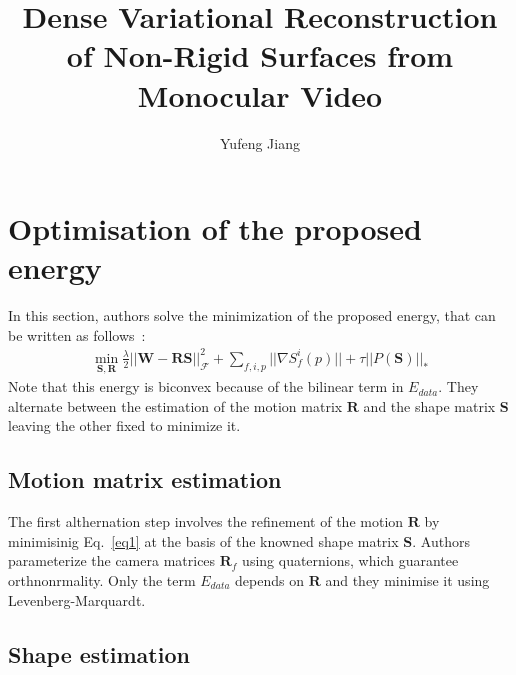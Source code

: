 \documentclass[10pt,twocolumn,letterpaper]{article}
\begin{document}
\title{Dense Variational Reconstruction of Non-Rigid Surfaces from Monocular Video}
\author{Yufeng Jiang}
\maketitle
\balance

\section{Optimisation of the proposed energy}

In this section, authors solve the minimization of the proposed energy, that can be written as follows~\cite{dense}:\\
\begin{gather}
\mathop{\min}\limits_{\mathbf{S},\mathbf{R}}\frac{\lambda}{2}||\mathbf{W} - \mathbf{RS}||_{\mathcal{F}}^2 + \sum_{f,i,p}||\nabla S_f^i(p)|| + \tau||P(\mathbf{S})||_{\ast}
\label{eq1}
\end{gather}
Note that this energy is biconvex because of the bilinear term in $E_{data}$. They alternate between the estimation of the motion matrix $\mathbf{R}$ and the shape matrix $\mathbf{S}$ leaving the other fixed to minimize it. 

\subsection{Motion matrix estimation}

The first althernation step involves the refinement of the motion $\mathbf{R}$ by minimisinig Eq.~\ref{eq1} at the basis of the knowned shape matrix $\mathbf{S}$. Authors parameterize the camera matrices $\mathbf{R}_f$ using quaternions, which guarantee orthnonrmality. Only the term $E_{data}$ depends on $\mathbf{R}$ and they minimise it using Levenberg-Marquardt. 

\subsection{Shape estimation}
\end{document}
